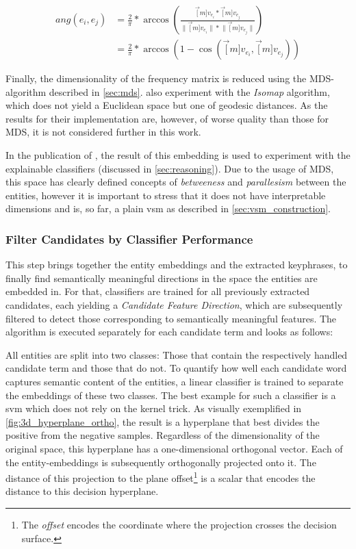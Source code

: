 \vspace{-5ex}
\begin{align}
	ang(e_i, e_j) &= \frac{2}{\pi} * \arccos \left( \frac{\vec[m]{v_{e_i}} * \vec[m]{v_{e_j}}} { \lVert \vec[m]{v_{e_i}} \rVert * \lVert \vec[m]{v_{e_j}} \rVert }  \right)  \label{eq:norm_ang_dist} \\
	&= \frac{2}{\pi} * \arccos(1-\cos(\vec[m]{v_{e_i}},\vec[m]{v_{e_j}})) \nonumber
\end{align}

Finally, the dimensionality of the frequency matrix is reduced using the MDS-algorithm described in \autoref{sec:mds}. \cite{Derrac2015} also experiment with the \textit{Isomap} algorithm, which does not yield a Euclidean space but one of geodesic distances. As the results for their implementation are, however, of worse quality than those for MDS, it is not considered further in this work. 

In the publication of \textcite{Derrac2015}, the result of this embedding is used to experiment with the explainable classifiers (discussed in \autoref{sec:reasoning}). Due to the usage of MDS, this space has clearly defined concepts of \textit{betweeness} and \textit{parallesism} between the entities, however it is important to stress that it does not have interpretable dimensions and is, so far, a plain \gls{vsm} as described in \autoref{sec:vsm_construction}. 


\subsubsection{Filter Candidates by Classifier Performance}
\label{sec:svm_filter_cands}

This step brings together the entity embeddings and the extracted keyphrases, to finally find semantically meaningful directions in the space the entities are embedded in. For that, classifiers are trained for all previously extracted candidates, each yielding a \textit{Candidate Feature Direction}, which are subsequently filtered to detect those corresponding to semantically meaningful features. The algorithm is executed separately for each candidate term and looks as follows:

All entities are split into two classes: Those that contain the respectively handled candidate term and those that do not. To quantify how well each candidate word captures semantic content of the entities, a linear classifier is trained to separate the embeddings of these two classes. The best example for such a classifier is a \gls{svm} which does not rely on the kernel trick. As visually exemplified in \autoref{fig:3d_hyperplane_ortho}, the result is a hyperplane that best divides the positive from the negative samples. Regardless of the dimensionality of the original space, this hyperplane has a one-dimensional orthogonal vector. Each of the entity-embeddings is subsequently orthogonally projected onto it. The distance of this projection to the plane offset\footnote{The \textit{offset} encodes the coordinate where the projection crosses the decision surface.} is a scalar that encodes the distance to this decision hyperplane. 

